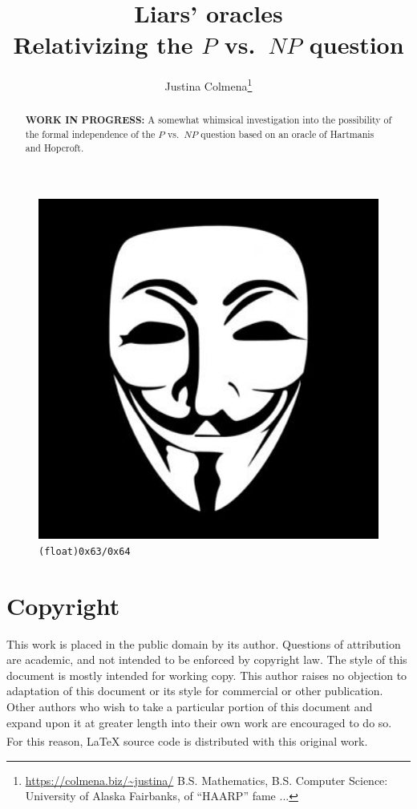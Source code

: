 \documentclass[letterpaper]{article}
\title{\textbf{Liars' oracles}\\ Relativizing the $P$ vs.\ $NP$ question}
\author{Justina Colmena\footnote{ \url{https://colmena.biz/~justina/} B.S. Mathematics, B.S. Computer Science: University of Alaska Fairbanks, of ``HAARP'' fame \cite[etc.]{haarp,haarp.net,begich2002angels,burks2010haarp,want2016haarp,smith1998haarp,freeland2014chemtrails} ...}}
\begin{document}
\sloppy
{}\maketitle
{}
\begin{abstract} {\color{red}\textbf{WORK IN PROGRESS:}}
A somewhat whimsical investigation into the possibility of the formal independence of the $P$ vs.\ $NP$ question based on an oracle of Hartmanis and Hopcroft.
\end{abstract}
\begin{figure}
	\includegraphics[width=1.0\textwidth]{guy_fawkes_mask.jpg}
	\caption[\texttt{(float)0x63/0x64}]{\texttt{(float)0x63/0x64} \cite{anon2012}}
\end{figure}

\tableofcontents

\listoffigures

\listofalgorithms

\listofGrammars

\section{Copyright}
This work is placed in the public domain by its author. Questions of attribution are academic, and not intended to be enforced by copyright law. The style of this document is mostly intended for working copy.  This author raises no objection to adaptation of this document or its style for commercial or other publication.  Other authors who wish to take a particular portion of this document and expand upon it at greater length into their own work are encouraged to do so. For this reason, \LaTeX\textsuperscript{\textregistered} source code is distributed with this original work.
\end{document}
